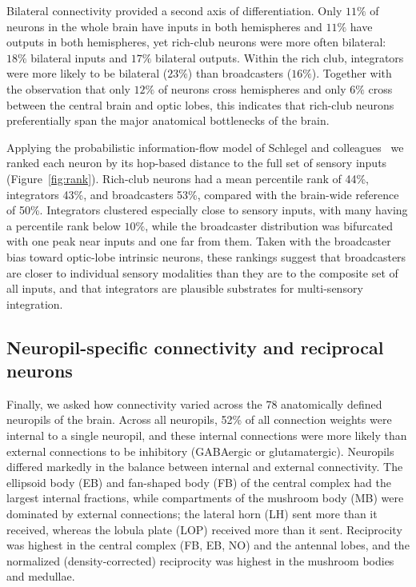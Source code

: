 \documentclass[11pt]{article}
\begin{document}
Bilateral connectivity provided a second axis of differentiation. Only
$11\%$ of neurons in the whole brain have inputs in both hemispheres and
$11\%$ have outputs in both hemispheres, yet rich-club neurons were more
often bilateral: $18\%$ bilateral inputs and $17\%$ bilateral outputs.
Within the rich club, integrators were more likely to be bilateral
($23\%$) than broadcasters ($16\%$). Together with the observation that
only $12\%$ of neurons cross hemispheres and only $6\%$ cross between the
central brain and optic lobes, this indicates that rich-club neurons
preferentially span the major anatomical bottlenecks of the brain.

Applying the probabilistic information-flow model of Schlegel and
colleagues~\cite{dorkenwald2024flywire,schlegel2024whole} we ranked each
neuron by its hop-based distance to the full set of sensory inputs
(Figure~\ref{fig:rank}). Rich-club neurons had a mean percentile rank of
44\%, integrators 43\%, and broadcasters 53\%, compared with the
brain-wide reference of 50\%. Integrators clustered especially close to
sensory inputs, with many having a percentile rank below $10\%$, while
the broadcaster distribution was bifurcated with one peak near inputs and
one far from them. Taken with the broadcaster bias toward optic-lobe
intrinsic neurons, these rankings suggest that broadcasters are closer to
individual sensory modalities than they are to the composite set of all
inputs, and that integrators are plausible substrates for multi-sensory
integration.

\subsection{Neuropil-specific connectivity and reciprocal neurons}

Finally, we asked how connectivity varied across the 78 anatomically
defined neuropils of the brain. Across all neuropils, 52\% of all
connection weights were internal to a single neuropil, and these internal
connections were more likely than external connections to be inhibitory
(GABAergic or glutamatergic). Neuropils differed markedly in the balance
between internal and external connectivity. The ellipsoid body (EB) and
fan-shaped body (FB) of the central complex had the largest internal
fractions, while compartments of the mushroom body (MB) were dominated by
external connections; the lateral horn (LH) sent more than it received,
whereas the lobula plate (LOP) received more than it sent. Reciprocity
was highest in the central complex (FB, EB, NO) and the antennal lobes,
and the normalized (density-corrected) reciprocity was highest in the
mushroom bodies and medullae.
\end{document}
